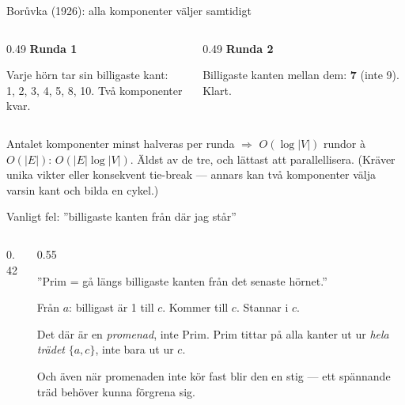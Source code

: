 {\kaninbg
\begin{frame}{\kh Borůvka (1926): alla komponenter väljer samtidigt}
\begin{columns}[T]
\begin{column}{0.49\textwidth}
\centering
{\small\bfseries\color{kthblue}Runda 1}\par
\par
\footnotesize Varje hörn tar sin billigaste kant:\\ 1, 2, 3, 4, 5, 8, 10. Två komponenter kvar.
\end{column}
\begin{column}{0.49\textwidth}
\centering
{\small\bfseries\color{kthblue}Runda 2}\par
\par
\footnotesize Billigaste kanten mellan dem: \textbf{7} (inte 9). Klart.
\end{column}
\end{columns}
\vfill
\begin{kaninbox}[fontupper=\footnotesize]
Antalet komponenter minst halveras per runda $\Rightarrow$ $O(\log|V|)$ rundor à $O(|E|)$:
$O(|E|\log|V|)$. Äldst av de tre, och lättast att parallellisera. (Kräver unika vikter
eller konsekvent tie-break — annars kan två komponenter välja varsin kant och bilda en cykel.)
\end{kaninbox}
\end{frame}}

\begin{frame}{Vanligt fel: ”billigaste kanten från där jag står”}
\begin{columns}[T]
\begin{column}{0.42\textwidth}
\centering

\end{column}
\begin{column}{0.55\textwidth}
\begin{missbox}
”Prim = gå längs billigaste kanten från det senaste hörnet.”
\end{missbox}
\small
Från $a$: billigast är 1 till $c$. Kommer till $c$. Stannar i $c$.
\medskip

Det där är en \emph{promenad}, inte Prim. Prim tittar på alla kanter
ut ur \emph{hela trädet} $\{a,c\}$, inte bara ut ur $c$.
\medskip

Och även när promenaden inte kör fast blir den en stig — ett spännande träd behöver
kunna förgrena sig.
\end{column}
\end{columns}
\end{frame}

